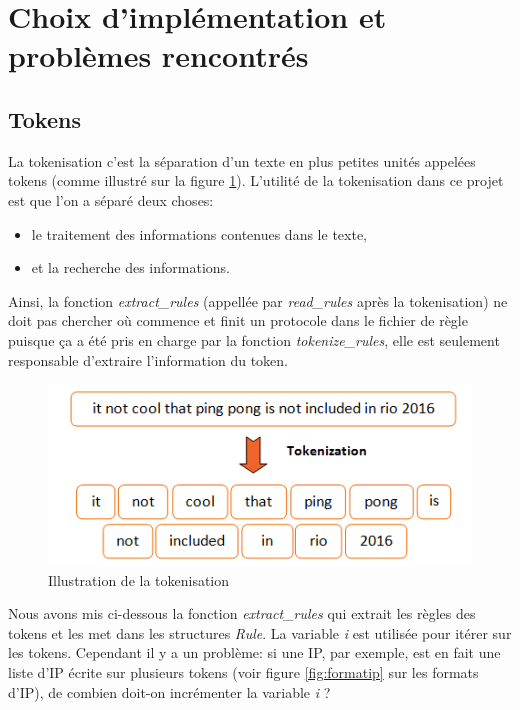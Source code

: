 \documentclass[a4paper]{article}
\begin{document}
\section{Choix d'implémentation et problèmes rencontrés} \label{sec:implspec}





\subsection{Tokens} \label{subsec:tokens}



La tokenisation c'est la séparation d'un texte en plus petites unités appelées tokens (comme illustré sur la figure \ref{fig:tokenization}). L'utilité de la tokenisation dans ce projet est que l'on a séparé deux choses:
\begin{itemize}
    \item le traitement des informations contenues dans le texte,
    \item et la recherche des informations.
\end{itemize}
Ainsi, la fonction \textit{extract\_rules} (appellée par \textit{read\_rules} après la tokenisation) ne doit pas chercher où commence et finit un protocole dans le fichier de règle puisque ça a été pris en charge par la fonction \textit{tokenize\_rules}, elle est seulement responsable d'extraire l'information du token.

\begin{figure}[H]
    \centering
    \includegraphics[width=0.65\linewidth]{images/tokenization.png}
    \caption{Illustration de la tokenisation \cite{6}}
    \label{fig:tokenization}
\end{figure}

Nous avons mis ci-dessous la fonction \textit{extract\_rules} qui extrait les règles des tokens et les met dans les structures \textit{Rule}. La variable \textit{i} est utilisée pour itérer sur les tokens. Cependant il y a un problème: si une IP, par exemple, est en fait une liste d'IP écrite sur plusieurs tokens (voir figure \ref{fig:formatip} sur les formats d'IP), de combien doit-on incrémenter la variable \textit{i} ?
\end{document}
